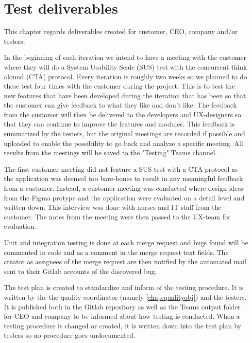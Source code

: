 \section{Test deliverables}
This chapter regards deliverables created for customer, CEO, company and/or testers.

\noindent In the beginning of each iteration we intend to have a meeting with the customer where they will do a System Usability Scale (SUS) test with the concurrent think alound (CTA) protocol. Every iteration is roughly two weeks so we planned to do these test four times with the customer during the project. This is to test the new features that have been developed during the iteration that has been so that the customer can give feedback to what they like and don't like. The feedback from the customer will then be delivered to the developers and UX-designers so that they can continue to improve the features and modules. This feedback is summarized by the testers, but the original meetings are recorded if possible and uploaded to enable the possibility to go back and analyze a specific meeting. All results from the meetings will be saved to the "Testing" Teams channel. \newline

\noindent The first customer meeting did not feature a SUS-test with a CTA protocol as the application was deemed too bare-bones to result in any meaningful feedback from a customer. Instead, a customer meeting was conducted where design ideas from the Figma protype and the application were evaluated on a detail level and written down. This interview was done with nurses and IT-staff from the customer. The notes from the meeting were then passed to the UX-team for evaluation.\newline

\noindent Unit and integration testing is done at each merge request and bugs found will be commented in code and as a comment in the merge request text fields. The creator as assignees of the merge request are then notified by the automated mail sent to their Gitlab accounts of the discovered bug.\newline

\noindent The test plan is created to standardize and inform of the testing procedure. It is written by the  the quality coordinator (namely \autoref{chap:qualityobj}) and the testers. It is published both in the Gitlab repository as well as the Teams output folder for CEO and company to be informed about how testing is conducted. When a testing procedure is changed or created, it is written down into the test plan by testers so no procedure goes undocumented.

